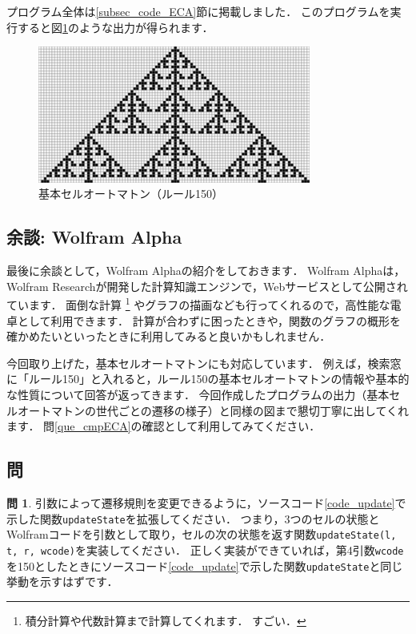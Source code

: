 \documentclass[dvipdfmx]{jsarticle}
\theoremstyle{definition}
\newtheorem{question}{問}[section]
\begin{document}
プログラム全体は\ref{subsec_code_ECA}節に掲載しました．
このプログラムを実行すると図\ref{pic_eca}のような出力が得られます．
%
\begin{figure}[H]
    \centering
    \includegraphics[width=0.8\textwidth]{figure/eca/eca.png}
    \caption{基本セルオートマトン（ルール150）}
    \label{pic_eca}
\end{figure}

\subsection{余談: Wolfram Alpha}  \label{subsec_wolfram_alpha}
最後に余談として，Wolfram Alpha\cite{wolalp}の紹介をしておきます．
Wolfram Alphaは，Wolfram Researchが開発した計算知識エンジンで，Webサービスとして公開されています．
面倒な計算
\footnote{
    積分計算や代数計算まで計算してくれます．
    すごい．
}
やグラフの描画なども行ってくれるので，高性能な電卓として利用できます．
計算が合わずに困ったときや，関数のグラフの概形を確かめたいといったときに利用してみると良いかもしれません．

今回取り上げた，基本セルオートマトンにも対応しています．
例えば，検索窓に「ルール150」と入れると，ルール150の基本セルオートマトンの情報や基本的な性質について回答が返ってきます．
今回作成したプログラムの出力（基本セルオートマトンの世代ごとの遷移の様子）と同様の図まで懇切丁寧に出してくれます．
問\ref{que_cmpECA}の確認として利用してみてください．

\subsection{問}  \label{subsec_q}
\begin{question}
    \label{que_update_exp}
    引数によって遷移規則を変更できるように，ソースコード\ref{code_update}で示した関数\verb|updateState|を拡張してください．
    つまり，3つのセルの状態とWolframコードを引数として取り，セルの次の状態を返す関数\verb|updateState(l, t, r, wcode)|を実装してください．
    正しく実装ができていれば，第4引数\verb|wcode|を150としたときにソースコード\ref{code_update}で示した関数\verb|updateState|と同じ挙動を示すはずです．
\end{question}
\end{document}
